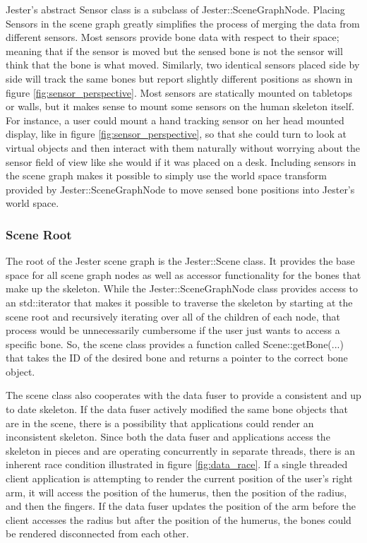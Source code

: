 Jester’s abstract Sensor class is a subclass of Jester::SceneGraphNode. Placing Sensors in the scene graph greatly simplifies the process of merging the data from different sensors. Most sensors provide bone data with respect to their space; meaning that if the sensor is moved but the sensed bone is not the sensor will think that the bone is what moved. Similarly, two identical sensors placed side by side will track the same bones but report slightly different positions as shown in figure \ref{fig:sensor_perspective}. Most sensors are statically mounted on tabletops or walls, but it makes sense to mount some sensors on the human skeleton itself. For instance, a user could mount a hand tracking sensor on her head mounted display, like in figure \ref{fig:sensor_perspective},  so that she could turn to look at virtual objects and then interact with them naturally without worrying about the sensor field of view like she would if it was placed on a desk. Including sensors in the scene graph makes it possible to simply use the world space transform provided by Jester::SceneGraphNode to move sensed bone positions into Jester’s world space. 

\subsubsection{Scene Root}\label{sec:scene_impl}

The root of the Jester scene graph is the Jester::Scene class. It provides the base space for all scene graph nodes as well as accessor functionality for the bones that make up the skeleton. While the Jester::SceneGraphNode class provides access to an std::iterator that makes it possible to traverse the skeleton by starting at the scene root and recursively iterating over all of the children of each node, that process would be unnecessarily cumbersome if the user just wants to access a specific bone. So, the scene class provides a function called Scene::getBone(...) that takes the ID of the desired bone and returns a pointer to the correct bone object.

The scene class also cooperates with the data fuser to provide a consistent and up to date skeleton. If the data fuser actively modified the same bone objects that are in the scene, there is a possibility that applications could render an inconsistent skeleton. Since both the data fuser and applications access the skeleton in pieces and are operating concurrently in separate threads, there is an inherent race condition illustrated in figure \ref{fig:data_race}. If a single threaded client application is attempting to render the current position of the user’s right arm, it will access the position of the humerus, then the position of the radius, and then the fingers. If the data fuser updates the position of the arm before the client accesses the radius but after the position of the humerus, the bones could be rendered disconnected from each other.

